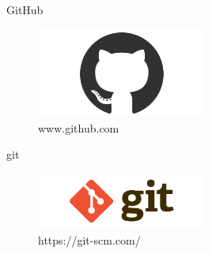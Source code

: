 \begin{frame}{GitHub}
    \begin{center}
        \begin{figure}[h]
            \includegraphics[width=0.5\textwidth]{imagens/github.png}
            \caption{www.github.com}
        \end{figure}
	\end{center}
\end{frame}
\begin{frame}{git}
    \begin{center}
        \begin{figure}[h]
            \includegraphics[width=0.5\textwidth]{imagens/git.png}
            \caption{https://git-scm.com/}
        \end{figure}
	\end{center}
\end{frame}
